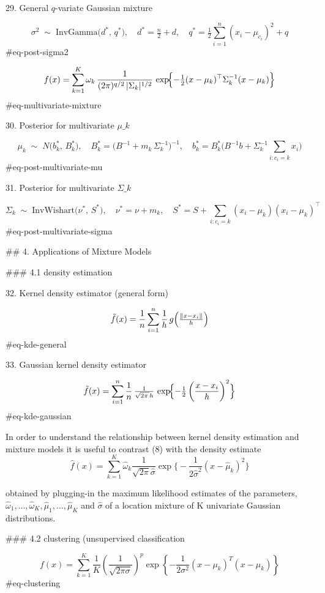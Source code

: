 29. General $q$-variate Gaussian mixture

$$
\sigma^2 \;\sim\;\mathrm{InvGamma}\bigl(d^*,\,q^*\bigr),
\quad
d^*=\tfrac{n}{2}+d,
\quad
q^*=\tfrac12\sum_{i=1}^n(x_i-\mu_{c_i})^2 + q
$$ {#eq-post-sigma2}

$$
f(x)
=\sum_{k=1}^K
\omega_k\,
\frac{1}{(2\pi)^{q/2}\,\lvert\Sigma_k\rvert^{1/2}}\,
\exp\!\Bigl\{-\tfrac12(x-\mu_k)^\top\Sigma_k^{-1}(x-\mu_k)\Bigr\}
$$ {#eq-multivariate-mixture}

30. Posterior for multivariate $\mu\_k$

$$
\mu_k \;\sim\; N\bigl(b_k^*,\,B_k^*\bigr),
\quad
B_k^*=\bigl(B^{-1}+m_k\,\Sigma_k^{-1}\bigr)^{-1},
\quad
b_k^*=B_k^*\bigl(B^{-1}b + \Sigma_k^{-1}\sum_{i:c_i=k}x_i\bigr)
$$ {#eq-post-multivariate-mu}

31. Posterior for multivariate $\Sigma\_k$

$$
\Sigma_k \;\sim\;\mathrm{InvWishart}\bigl(\nu^*,\,S^*\bigr),
\quad
\nu^*=\nu + m_k,
\quad
S^*=S + \sum_{i:c_i=k}(x_i-\mu_k)(x_i-\mu_k)^\top
$$ {#eq-post-multivariate-sigma}



## 4. Applications of Mixture Models


### 4.1 density estimation


32. Kernel density estimator (general form)

$$
\tilde f(x)
=\frac{1}{n}\sum_{i=1}^n\frac{1}{h}\,
g \Bigl(\tfrac{\|x-x_i \| }{h}\Bigr)
$$ {#eq-kde-general}

33. Gaussian kernel density estimator

$$
\tilde f(x)
=\sum_{i=1}^n\frac{1}{n}\,
\tfrac{1}{\sqrt{2\pi\,}h}\,
\exp\!\Bigl\{-\tfrac{1}{2}\left(\dfrac{x-x_i}{h}\right)^2\Bigr\}
$$ {#eq-kde-gaussian}


In order to understand the relationship between kernel density estimation
and mixture models it is useful to contrast (8) with the density estimate
$$
\hat f(x) = \sum_{k=1}^K \hat{\omega}_k \frac{1}{\sqrt{2\pi} \hat{\sigma}} \exp\Biggl\{-\frac{1}{2\hat{\sigma}^2}(x - \hat{\mu}_k)^2\Biggr\}
$$

obtained by plugging-in the maximum likelihood estimates of the parameters, $\hat{\omega}_1, . . . , \hat{\omega}_K, \hat{\mu}_1, . . . , \hat{\mu}_K$ and $\hat{\sigma}$ of a location mixture of K univariate Gaussian distributions.

### 4.2 clustering (unsupervised classification

$$
f(x) = \sum_{k=1}^K \frac{1}{K} \left(\frac{1}{\sqrt{2\pi\sigma}} \right)^p \exp\left\{-\frac{1}{2\sigma^2} (x − \mu_k)^T (x − \mu_k)\right\}
$$ {#eq-clustering}




